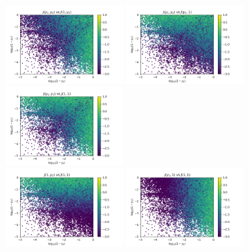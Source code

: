 \documentclass[a4paper,10pt]{article}
\begin{document}
%
\begin{figure}
    \centering
    \includegraphics[width=0.4\textwidth, trim=0.2cm 0 1.8cm 0, clip]{figures/ratio_JAC_0_1.png}
    \includegraphics[width=0.4\textwidth, trim=0.2cm 0 1.8cm 0, clip]{figures/ratio_JAC_0_2.png}\\
    \includegraphics[width=0.4\textwidth, trim=0.2cm 0 1.8cm 0, clip]{figures/ratio_JAC_0_3.png}\\
    \includegraphics[width=0.4\textwidth, trim=0.2cm 0 1.8cm 0, clip]{figures/ratio_JAC_1_3.png}
    \includegraphics[width=0.4\textwidth, trim=0.2cm 0 1.8cm 0, clip]{figures/ratio_JAC_2_3.png}
\end{figure}
\end{document}
